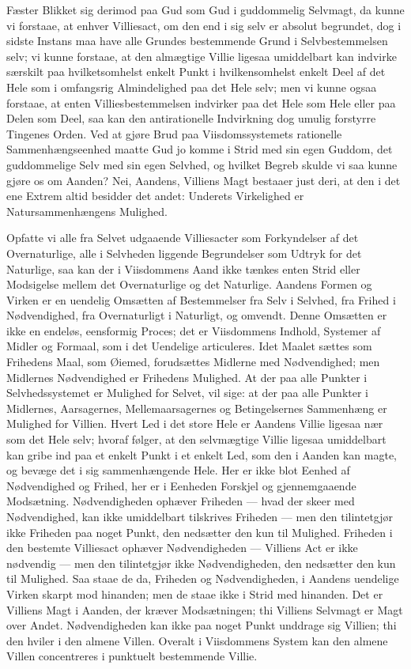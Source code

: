 \documentclass[12pt]{book}
\begin{document}
Fæster Blikket sig derimod paa Gud som Gud i guddommelig Selvmagt,
da kunne vi forstaae, at enhver Villiesact, om den end i sig selv er
absolut begrundet, dog i sidste Instans maa have alle Grundes
bestemmende Grund i Selvbestemmelsen selv; vi kunne forstaae, at den
almægtige Villie ligesaa umiddelbart kan indvirke særskilt paa
hvilketsomhelst enkelt Punkt i hvilkensomhelst enkelt Deel af det
Hele som i omfangsrig Almindelighed paa det Hele selv; men vi kunne
ogsaa forstaae, at enten Villiesbestemmelsen indvirker paa det Hele
som Hele eller paa Delen som Deel, saa kan den antirationelle
Indvirkning dog umulig forstyrre Tingenes Orden.
Ved at gjøre Brud paa Viisdomssystemets rationelle Sammenhængseenhed
maatte Gud jo komme i Strid med sin egen Guddom, det guddommelige
Selv med sin egen Selvhed, og hvilket Begreb skulde vi saa kunne
gjøre os om Aanden? Nei, Aandens, Villiens Magt bestaaer just deri,
at den i det ene Extrem altid besidder det andet: Underets
Virkelighed er Natursammenhængens Mulighed.

Opfatte vi alle fra Selvet udgaaende Villiesacter som Forkyndelser
af det Overnaturlige, alle i Selvheden liggende Begrundelser som
Udtryk for det Naturlige, saa kan der i Viisdommens Aand ikke tænkes
enten Strid eller Modsigelse mellem det Overnaturlige og det
Naturlige. Aandens Formen og Virken er en uendelig Omsætten af
Bestemmelser fra Selv i Selvhed, fra Frihed i Nødvendighed, fra
Overnaturligt i Naturligt, og omvendt. Denne Omsætten er ikke en
endeløs, eensformig Proces; det er Viisdommens Indhold, Systemer af
Midler og Formaal, som i det Uendelige articuleres. Idet Maalet
sættes som Frihedens Maal, som Øiemed, forudsættes Midlerne med
Nødvendighed; men Midlernes Nødvendighed er Frihedens Mulighed. At
der paa alle Punkter i Selvhedssystemet er Mulighed for Selvet, vil
sige: at der paa alle Punkter i Midlernes, Aarsagernes,
Mellemaarsagernes og Betingelsernes Sammenhæng er Mulighed for
Villien. Hvert Led i det store Hele er Aandens Villie ligesaa nær
som det Hele selv; hvoraf følger, at den selvmægtige Villie ligesaa
umiddelbart kan gribe ind paa et enkelt Punkt i et enkelt Led, som
den i Aanden kan magte, og bevæge det i sig sammenhængende Hele. Her
er ikke blot Eenhed af Nødvendighed og Frihed, her er i Eenheden
Forskjel og gjennemgaaende Modsætning. Nødvendigheden ophæver
Friheden --- hvad der skeer med Nødvendighed, kan ikke umiddelbart
tilskrives Friheden --- men den tilintetgjør ikke Friheden paa noget
Punkt, den nedsætter den kun til Mulighed. Friheden i den bestemte
Villiesact ophæver
Nødvendigheden --- Villiens Act er ikke nødvendig --- men den
tilintetgjør ikke Nødvendigheden, den nedsætter den kun til
Mulighed. Saa staae de da, Friheden og Nødvendigheden, i Aandens
uendelige Virken skarpt mod hinanden; men de staae ikke i Strid med
hinanden. Det er Villiens Magt i Aanden, der kræver Modsætningen;
thi Villiens Selvmagt er Magt over Andet. Nødvendigheden kan ikke
paa noget Punkt unddrage sig Villien; thi den hviler i den almene
Villen. Overalt i Viisdommens System kan den almene Villen
concentreres i punktuelt bestemmende Villie.
\end{document}
